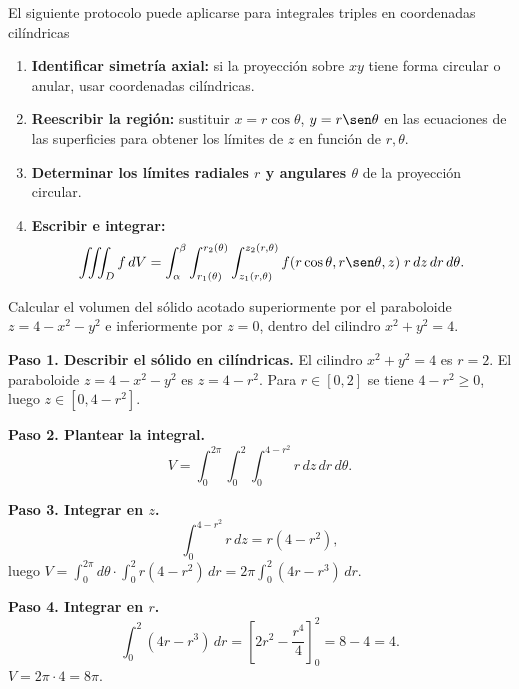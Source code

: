 \begin{pasos} El siguiente protocolo puede aplicarse para integrales triples en coordenadas cilíndricas
\begin{enumerate}
    \item \textbf{Identificar simetría axial:} si la proyección sobre $xy$ tiene forma circular o anular, usar coordenadas cilíndricas.
    \item \textbf{Reescribir la región:} sustituir $x=r\cos\theta$, $y=r\sen\theta$ en las ecuaciones de las superficies para obtener los límites de $z$ en función de $r,\theta$.
    \item \textbf{Determinar los límites radiales $r$ y angulares $\theta$} de la proyección circular.
    \item \textbf{Escribir e integrar:}
    \[
    \iiint_D f\,dV = \int_{\alpha}^{\beta}\int_{r_1(\theta)}^{r_2(\theta)}\int_{z_1(r,\theta)}^{z_2(r,\theta)}
    f(r\cos\theta,r\sen\theta,z)\;r\,dz\,dr\,d\theta.
    \]
\end{enumerate}
\end{pasos}

\begin{example}
Calcular el volumen del sólido acotado superiormente por el paraboloide $z=4-x^2-y^2$ e inferiormente por $z=0$, dentro del cilindro $x^2+y^2=4$.
\begin{myproof}
\textbf{Paso 1. Describir el sólido en cilíndricas.} El cilindro $x^2+y^2=4$ es $r=2$. El paraboloide $z=4-x^2-y^2$ es $z=4-r^2$. Para $r\in[0,2]$ se tiene $4-r^2\ge0$, luego $z\in[0,4-r^2]$.

\textbf{Paso 2. Plantear la integral.}
\[
V = \int_{0}^{2\pi}\int_{0}^{2}\int_{0}^{4-r^2} r\,dz\,dr\,d\theta.
\]

\textbf{Paso 3. Integrar en $z$.}
\[
\int_{0}^{4-r^2} r\,dz = r(4-r^2),
\]
luego $V = \displaystyle\int_{0}^{2\pi}d\theta \cdot \int_{0}^{2} r(4-r^2)\,dr = 2\pi\int_{0}^{2}(4r-r^3)\,dr$.

\textbf{Paso 4. Integrar en $r$.}
\[
\int_{0}^{2}(4r-r^3)\,dr = \left[2r^2 - \frac{r^4}{4}\right]_{0}^{2} = 8-4 = 4.
\]
$\displaystyle\boxed{V = 2\pi\cdot 4 = 8\pi}$.
\end{myproof}
\end{example}

